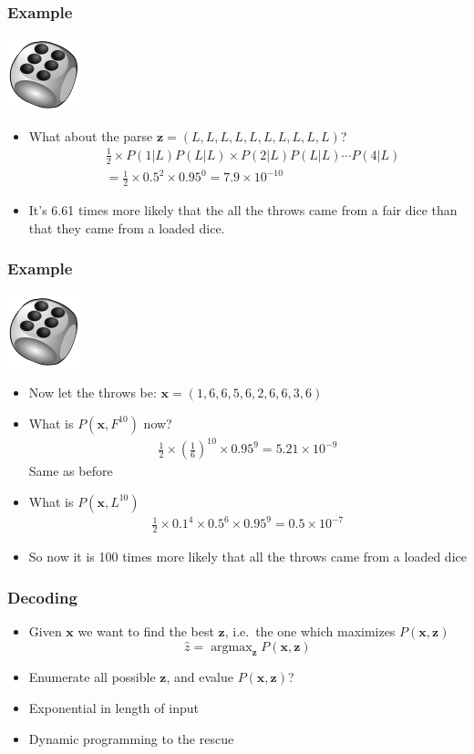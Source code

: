 \documentclass[usenames,dvipsnames]{beamer}
\DeclareMathOperator*{\argmax}{argmax}
\newcommand{\x}{\mathbf{x}}
\newcommand{\z}{\mathbf{z}}
\begin{document}
 \begin{frame}
      \frametitle{Example}
\vskip -0.8cm
\hskip 9cm \includegraphics{dice.png}
\begin{itemize}
  \item What about the parse $\z = (L,L,L,L,L,L,L,L,L,L)$?
    \begin{align*}
      & \frac{1}{2} \times P(1|L)P(L|L) \times P(2|L) P(L|L) \cdots
      P(4|L)\\
      & = \frac{1}{2} \times 0.5^2 \times 0.95^0 = 7.9 \times 10^{-10}
    \end{align*}
  \item It's 6.61 times more likely that the all the throws came from
    a fair dice than that they came from a loaded dice.
\end{itemize}
 \end{frame}


 \begin{frame}
      \frametitle{Example}
\vskip -0.8cm
\hskip 9cm \includegraphics{dice.png}
\begin{itemize}
\item Now let the throws be: $\x = (1,6,6,5,6,2,6,6,3,6)$
\item What is $P(\x,F^{10})$ now?  
  \pause
  \begin{align*}
    \frac{1}{2} \times \left(\frac{1}{6}\right)^{10} \times 0.95^9 = 5.21 \times 10^{-9}
  \end{align*}
  \alert{Same as before}
  \pause
\item What is  $P(\x,L^{10})$
  \pause
  \begin{align*}
    \frac{1}{2} \times 0.1^4 \times 0.5^6 \times 0.95^9 = 0.5 \times 10^{-7}
  \end{align*}
\item So now it is 100 times more likely that all the throws came from
  a loaded dice
\end{itemize}
\end{frame}


\begin{frame}
  \frametitle{Decoding}
  \begin{itemize}
  \item Given $\x$ we want to find the best $\z$, i.e.\ the one which
    maximizes $P(\x,\z)$
    \[
    \hat{z} = \argmax_{\z} P(\x,\z)
    \]
  \item Enumerate all possible $\z$, and evalue $P(\x,\z)$?
    \pause
  \item Exponential in length of input
    \pause
  \item Dynamic programming to the rescue
  \end{itemize}
\end{frame}
\end{document}
